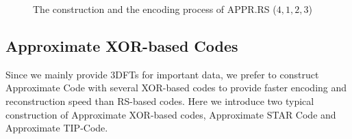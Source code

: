 \documentclass[sigconf]{acmart}
\begin{document}
\begin{figure}
    \caption{The construction and the encoding process of APPR.RS ($4,1,2,3$)}
\end{figure}

\subsection{Approximate XOR-based Codes}\label{APPRXOR}
Since we mainly provide 3DFTs for important data, we prefer to construct Approximate Code with several XOR-based codes to provide faster encoding and reconstruction speed than RS-based codes. Here we introduce two typical construction of Approximate XOR-based codes, Approximate STAR Code and Approximate TIP-Code.
\end{document}
